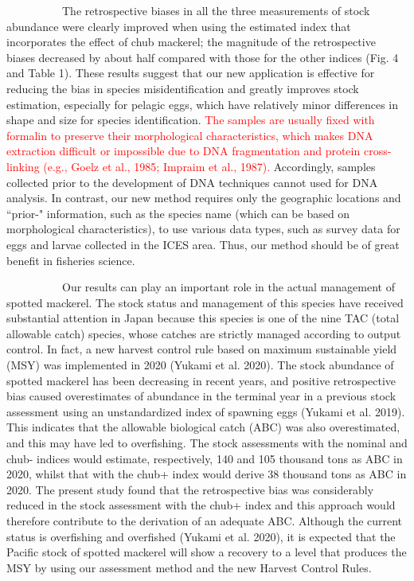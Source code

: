 \documentclass[12pt]{article}
\begin{document}
\begin{linenumbers}
\ \ \ \ \ \ \ \ \ \
The retrospective biases in all the three measurements of stock abundance were clearly improved when using the estimated index that incorporates the effect of chub mackerel; the magnitude of the retrospective biases decreased by about half compared with those for the other indices (Fig. 4 and Table 1). These results suggest that our new application is effective for reducing the bias in species misidentification and greatly improves stock estimation, especially for pelagic eggs, which have relatively minor differences in shape and size for species identification.
\textcolor{red}{The samples are usually fixed with formalin to preserve their morphological characteristics, which makes DNA extraction difficult or impossible due to DNA fragmentation and protein cross-linking (e.g., Goelz et al., 1985; Impraim et al., 1987).} Accordingly, samples collected prior to the development of DNA techniques cannot used for DNA analysis. In contrast, our new method requires only the geographic locations and ``prior-" information, such as the species name (which can be based on morphological characteristics), to use various data types, such as survey data for eggs and larvae collected in the ICES area. Thus, our method should be of great benefit in fisheries science.

\ \ \ \ \ \ \ \ \ \
Our results can play an important role in the actual management of spotted mackerel. The stock status and management of this species have received substantial attention in Japan because this species is one of the nine TAC (total allowable catch) species, whose catches are strictly managed according to output control. In fact, a new harvest control rule based on maximum sustainable yield (MSY) was implemented in 2020 (Yukami et al. 2020). The stock abundance of spotted mackerel has been decreasing in recent years, and positive retrospective bias caused overestimates of abundance in the terminal year in a previous stock assessment using an unstandardized index of spawning eggs (Yukami et al. 2019). This indicates that the allowable biological catch (ABC) was also overestimated, and this may have led to overfishing.
The stock assessments with the nominal and chub- indices would estimate, respectively, 140 and 105 thousand tons as ABC in 2020, whilst that with the chub+ index would derive 38 thousand tons as ABC in 2020. The present study found that the retrospective bias was considerably reduced in the stock assessment with the chub+ index and this approach would therefore contribute to the derivation of an adequate ABC. Although the current status is overfishing and overfished (Yukami et al. 2020), it is expected that the Pacific stock of spotted mackerel will show a recovery to a level that produces the MSY by using our assessment method and the new Harvest Control Rules.


\end{linenumbers}
\end{document}
